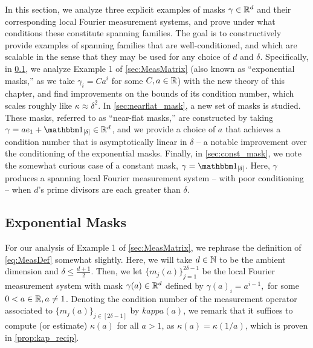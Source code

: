 \label{sec:reanalyze}

In this section, we analyze three explicit examples of masks $\gamma \in \mathbb{R}^d$ and their corresponding local Fourier measurement systems, and prove under what conditions these constitute spanning families.  The goal is to constructively provide examples of spanning families that are well-conditioned, and which are scalable in the sense that they may be used for any choice of $d$ and $\delta$.  Specifically, in \cref{sec:exp_mask}, we analyze Example 1 of \cref{sec:MeasMatrix} (also known as ``exponential masks,'' as we take $\gamma_i = C a^i$ for some $C, a \in \mathbb{R}$) with the new theory of this chapter, and find improvements on the bounds of its condition number, which scales roughly like $\kappa \approx \delta^2$.  In \cref{sec:nearflat_mask}, a new set of masks is studied.  These masks, referred to as ``near-flat masks,'' are constructed by taking $\gamma = a e_1 + \one_{[\delta]} \in \Rd$, and we provide a choice of $a$ that achieves a condition number that is asymptotically linear in $\delta$ -- a notable improvement over the conditioning of the exponential masks.  Finally, in \cref{sec:const_mask}, we note the somewhat curious case of a constant mask, $\gamma = \one_{[\delta]}$.  Here, $\gamma$ produces a spanning local Fourier measurement system -- with poor conditioning -- when $d$'s prime divisors are each greater than $\delta$.

\subsection{Exponential Masks}
\label{sec:exp_mask}
For our analysis of Example 1 of \cref{sec:MeasMatrix}, we rephrase the definition of \eqref{eq:MeasDef} somewhat slightly.  Here, we will take $d \in \mathbb{N}$ to be the ambient dimension and $\delta \le \frac{d + 1}{2}$.  Then, we let $\{m_j(a)\}_{j = 1}^{2 \delta - 1}$ be the local Fourier measurement system with mask $\gamma(a) \in \mathbb{R}^d$ defined by $\gamma(a)_i = a^{i - 1},$ for some $0 < a \in \mathbb{R}, a \neq 1$.  Denoting the condition number of the measurement operator associated to $\{m_j(a)\}_{j \in [2 \delta - 1]}$ by $kappa(a)$, we remark that it suffices to compute (or estimate) $\kappa(a)$ for all $a > 1$, as $\kappa(a) = \kappa(1 / a)$, which is proven in \cref{prop:kap_recip}.

